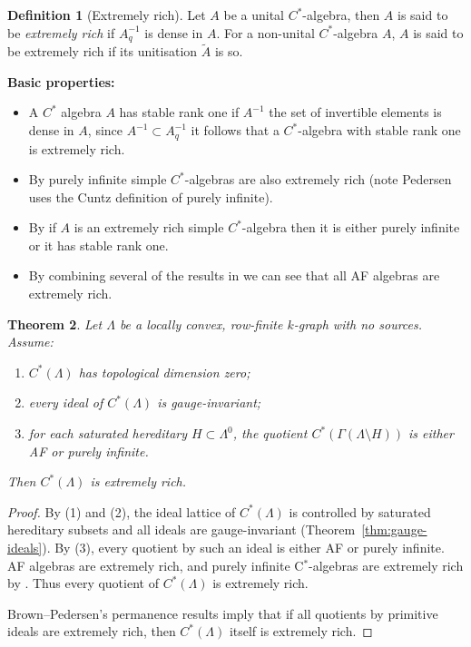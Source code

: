 \documentclass[12pt]{amsart}
\newcommand{\Ee}{\mathcal{E}}
\theoremstyle{plain}
\newtheorem{theorem}{Theorem}[section]
\theoremstyle{definition}
\newtheorem{definition}[theorem]{Definition}
\theoremstyle{remark}
\begin{document}
\begin{definition}[Extremely rich]
Let $A$ be a unital $C^*$-algebra, then $A$ is said to be \emph{extremely rich} if $A_q^{-1}$ is dense in $A$. For a non-unital $C^*$-algebra $A$, $A$ is said to be extremely rich if its unitisation $\widetilde{A}$ is so.
\end{definition}

\noindent
\textbf{Basic properties:}
\begin{itemize}
\item[(i)] A $C^*$ algebra $A$ has stable rank one if $A^{-1}$ the set of invertible elements is dense in $A$, since $A^{-1} \subset A^{-1}_q$ it follows that a $C^*$-algebra with stable rank one is extremely rich.
\item[(ii)] By \cite[Theorem 10.1]{Pe0} purely infinite simple $C^*$-algebras are also extremely rich (note Pedersen uses the Cuntz definition of purely infinite).
\item[(iii)] By \cite[Corollary 2.9]{BP3} if $A$ is an extremely rich simple $C^*$-algebra then it is either purely infinite or it has stable rank one.
\item[(iv)] By combining several of the results in \cite{BP} we can see that all AF algebras are extremely rich.
\end{itemize}


\begin{theorem}\label{thm:extreme-rich-structure}
Let $\Lambda$ be a locally convex, row-finite $k$-graph with no sources.
Assume:
\begin{enumerate}
\item $C^*(\Lambda)$ has topological dimension zero;
\item every ideal of $C^*(\Lambda)$ is gauge-invariant;
\item for each saturated hereditary $H\subset\Lambda^0$, the quotient
      $C^*(\Gamma(\Lambda\setminus H))$ is either AF or purely infinite.
\end{enumerate}
Then $C^*(\Lambda)$ is extremely rich.
\end{theorem}

\begin{proof}
By (1) and (2), the ideal lattice of $C^*(\Lambda)$ is controlled by saturated
hereditary subsets and all ideals are gauge-invariant (Theorem~\ref{thm:gauge-ideals}).
By (3), every quotient by such an ideal is either AF or purely infinite. AF algebras
are extremely rich, and purely infinite C$^*$-algebras are extremely rich by
\cite{KR,Pe0}. Thus every quotient of $C^*(\Lambda)$ is extremely rich.

Brown--Pedersen’s permanence results \cite{BP2,BP3} imply that if all quotients
by primitive ideals are extremely rich, then $C^*(\Lambda)$ itself is extremely rich.
\end{proof}
\end{document}
